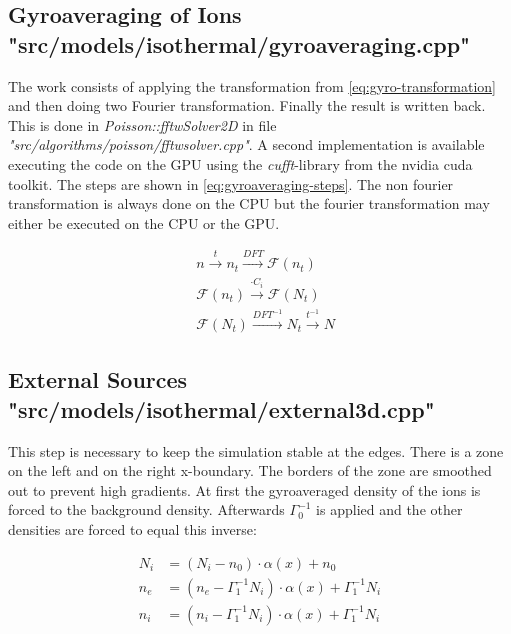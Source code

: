 \documentclass[master.tex]{subfiles}
\begin{document}
\subsection{Gyroaveraging of Ions {\small "src/models/isothermal/gyroaveraging.cpp"}}
\label{sec:components-gryoaverage}
The work consists of applying the transformation from \autoref{eq:gyro-transformation} and then doing two Fourier transformation. Finally the result is written back. This is done in \textit{Poisson::fftwSolver2D} in file \textit{"src/algorithms/poisson/fftwsolver.cpp"}.
A second implementation is available executing the code on the GPU using the \textit{cufft}-library from the nvidia cuda toolkit. The steps are shown in \autoref{eq:gyroaveraging-steps}. The non fourier transformation is always done on the CPU but the fourier transformation may either be executed on the CPU or the GPU.

\begin{equation}\label{eq:gyroaveraging-steps}
    \begin{split}
    &n \overset{t}{\longrightarrow} n_t \overset{DFT}{\longrightarrow} \mathcal{F}(n_t)\\
    &\mathcal{F}(n_t) \overset{\cdot C_i}{\longrightarrow} \mathcal{F}(N_t)\\
    &\mathcal{F}(N_t) \overset{DFT^{-1}}{\longrightarrow} N_t \overset{t^{-1}}{\longrightarrow} N
    \end{split}
\end{equation}

\subsection{External Sources {\small "src/models/isothermal/external3d.cpp"}}
\label{sec:components-external}
This step is necessary to keep the simulation stable at the edges. There is a zone on the left and on the right x-boundary. The borders of the zone are smoothed out to prevent high gradients. At first the gyroaveraged density of the ions is forced to the background density. Afterwards $\Gamma_0^{-1}$ is applied and the other densities are forced to equal this inverse:

\begin{align}
    N_i &= (N_i - n_0) \cdot \alpha(x) + n_0\\
    n_e &= (n_e - \Gamma_1^{-1}N_i) \cdot \alpha(x) + \Gamma_1^{-1}N_i\\
    n_i &= (n_i - \Gamma_1^{-1}N_i) \cdot \alpha(x) + \Gamma_1^{-1}N_i
\end{align}
 
\end{document}
